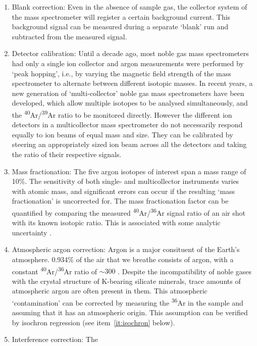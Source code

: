 \documentclass{article}
\begin{document}
\begin{enumerate}
\item Blank correction: Even in the absence of sample gas, the
  collector system of the mass spectrometer will register a certain
  background current. This background signal can be measured during a
  separate `blank' run and subtracted from the measured signal.
\item Detector calibration: Until a decade ago, most noble gas mass
  spectrometers had only a single ion collector and argon measurements
  were performed by `peak hopping', i.e., by varying the magnetic
  field strength of the mass spectrometer to alternate between
  different isotopic masses. In recent years, a new generation of
  `multi-collector' noble gas mass spectrometers have been developed,
  which allow multiple isotopes to be analysed simultaneously, and the
  \textsuperscript{40}Ar/\textsuperscript{39}Ar ratio to be monitored
  directly. However the different ion detectors in a multicollector
  mass spectrometer do not necessarily respond equally to ion beams of
  equal mass and size. They can be calibrated by steering an
  appropriately sized ion beam across all the detectors and taking the
  ratio of their respective signals.
\item Mass fractionation: The five argon isotopes of interest span a
  mass range of 10\%. The sensitivity of both single- and
  multicollector instruments varies with atomic mass, and significant
  errors can occur if the resulting `mass fractionation' is
  uncorrected for. The mass fractionation factor can be quantified by
  comparing the measured \textsuperscript{40}Ar/\textsuperscript{36}Ar
  signal ratio of an air shot with its known isotopic ratio. This is
  associated with some analytic uncertainty \citep[e.g., 298.56 $\pm$
    0.31,][]{lee2006}.
\item\label{it:atmospheric} Atmospheric argon correction: Argon is a
  major consituent of the Earth's atmosphere. 0.934\% of the air that
  we breathe consists of argon, with a constant
  \textsuperscript{40}Ar/\textsuperscript{36}Ar ratio of $\sim 300$
  \citep{nier1950, lee2006}. Despite the incompatibility of noble
  gases with the crystal structure of K-bearing silicate minerals,
  trace amounts of atmospheric argon are often present in them. This
  atmospheric `contamination' can be corrected by measuring the
  \textsuperscript{36}Ar in the sample and assuming that it has an
  atmospheric origin. This assumption can be verified by isochron
  regression (see item~\ref{it:isochron} below).
\item Interference correction: The

\end{enumerate}
\end{document}
